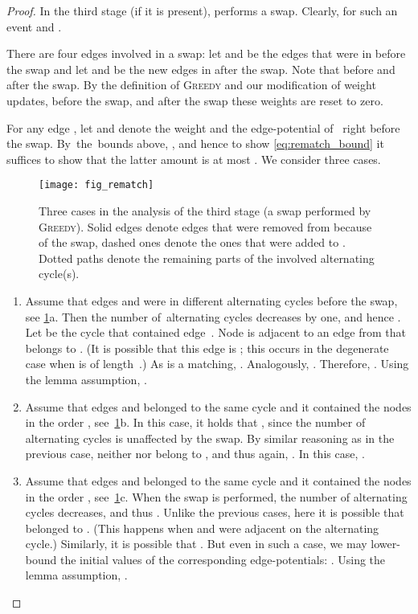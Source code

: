 \documentclass{siamart190516}
\newcommand{\GREEDY}{\textsc{Greedy}\xspace}
\begin{document}
\begin{proof}
In the third stage (if it is present),  performs a swap. Clearly, for
such an event  and . 

There are four edges involved in a swap: let  and  be the
edges that were in  before the swap and let  and  be
the new edges in  after the swap. Note that 
before and after the swap. By the definition of \GREEDY and our modification
of weight updates,  before the swap, and after the swap these weights are reset to
zero.

For any edge , let  and  denote the weight and the
edge-potential of~ right before the swap. By~the~bounds above, , and hence to show
\eqref{eq:rematch_bound} it suffices to show that the latter amount is at most
. We consider three cases.

\begin{figure}
\centering
\texttt{[image: fig\_rematch]}
\caption{Three cases in the analysis of the third stage (a swap performed by
\GREEDY). Solid edges denote edges that were removed from  because
of the swap, dashed ones denote the ones that were added to . Dotted
paths denote the remaining parts of the involved alternating cycle(s).}
\label{fig:rematch}
\end{figure}

\begin{enumerate}

\item
Assume that edges  and  were in different alternating
cycles before the swap, see \cref{fig:rematch}a. Then the number
of~alternating cycles decreases by one, and hence . Let  be the cycle that contained edge~. Node  is adjacent
to an edge from  that belongs to . (It is possible that this edge is
; this occurs in the degenerate case when  is of length~.) As
 is a matching, . Analogously, . Therefore, . Using the lemma assumption,
.

\item
Assume that edges  and  belonged to the same cycle and
it contained the nodes in the order ,
see~\cref{fig:rematch}b. In this case, it holds that 
, since 
the number of alternating cycles is unaffected by the swap. By similar
reasoning as in the previous case, neither  nor  belong to
, and thus again, . In this case, .

\item 
Assume that edges  and  belonged to the same cycle and
it contained the nodes in the order ,
see~\cref{fig:rematch}c. When the swap is performed, the number of
alternating cycles decreases, and thus . Unlike
the previous cases, here it is possible that  belonged to .
(This happens when  and  were adjacent on the alternating cycle.)
Similarly, it is possible that . 
But even in such a case, we may lower-bound the initial values of the
corresponding edge-potentials: . Using the lemma
assumption, .
\end{enumerate}

\end{proof}
\end{document}
